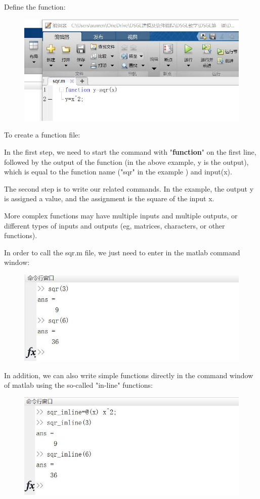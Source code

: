 \documentclass[10pt,math=newtx,citestyle=gb7714-2015,bibstyle=gb7714-2015]{elegantbook}
\begin{document}
{{{	Define the function:
	\begin{figure}[htbp!]
		\centering
		\includegraphics[width=0.8\linewidth]{FIG/function1}
		\centering
	\end{figure}
	
	To create a function file:
	
	In the first step, we need to start the command with "\textbf{function}" on the first line, followed by the output of the function (in the above example, y is the output), which is equal to the function name ("sqr" in the example ) and input(x).
	
	The second step is to write our related commands. In the example, the output y is assigned a value, and the assignment is the square of the input x.
	
	More complex functions may have multiple inputs and multiple outputs, or different types of inputs and outputs (eg, matrices, characters, or other functions).
	
	In order to call the sqr.m file, we just need to enter in the matlab command window:
	
	\begin{figure}[htbp!]
		\centering
		\includegraphics[width=0.8\linewidth]{FIG/sqr}
		\centering
	\end{figure}
	
	In addition, we can also write simple functions directly in the command window of matlab using the so-called "in-line" functions:
	\begin{figure}[htbp!]
		\centering
		\includegraphics[width=0.8\linewidth]{FIG/inlinefunction}
		\centering
	\end{figure}
	
}}}
\end{document}
